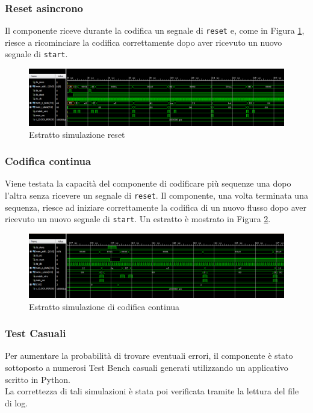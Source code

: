 \documentclass{article}
\begin{document}
\subsubsection{Reset asincrono}
Il componente riceve durante la codifica un segnale di \verb|reset| e, come in Figura \ref{fig:Reset}, riesce a ricominciare la codifica correttamente dopo aver ricevuto un nuovo segnale di \verb|start|.\\
\begin{figure}[h]
    \vspace{5pt}
    \centering
    \includegraphics[width=\textwidth]{Resources/Reset.png}
    \caption{Estratto simulazione reset}
    \label{fig:Reset}
    \vspace{5pt}
\end{figure}

\subsubsection{Codifica continua}
Viene testata la capacità del componente di codificare più sequenze una dopo l'altra senza ricevere un segnale di \verb|reset|. Il componente, una volta terminata una sequenza, riesce ad iniziare correttamente la codifica di un nuovo flusso dopo aver ricevuto un nuovo segnale di \verb|start|. Un estratto è mostrato in Figura \ref{fig:Tre_Res}.
\begin{figure}[h]
    \vspace{5pt}
    \centering
    \includegraphics[width=\textwidth]{Resources/Tre_Res.png}
    \caption{Estratto simulazione di codifica continua}
    \label{fig:Tre_Res}
    \vspace{5pt}
\end{figure}

\subsubsection{Test Casuali}
Per aumentare la probabilità di trovare eventuali errori, il componente è stato sottoposto a numerosi Test Bench casuali generati utilizzando un applicativo scritto in Python.\\
La correttezza di tali simulazioni è stata poi verificata tramite la lettura del file di log.
\vspace{20pt}
\end{document}
